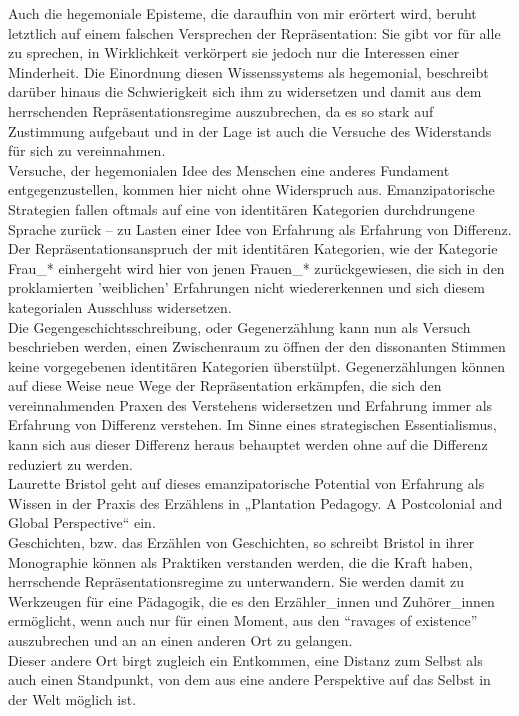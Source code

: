   \noindent Auch die hegemoniale Episteme, die daraufhin von
  mir erörtert wird, beruht letztlich auf einem falschen Versprechen der
  Repräsentation: Sie gibt vor für alle zu sprechen,  in Wirklichkeit
  verkörpert sie jedoch nur die Interessen einer Minderheit.  Die Einordnung
  diesen Wissenssystems als hegemonial, beschreibt darüber hinaus die
  Schwierigkeit sich ihm zu widersetzen und damit aus dem herrschenden
  Repräsentationsregime auszubrechen, da es so stark auf  Zustimmung aufgebaut
  und in der Lage ist auch die Versuche des Widerstands für sich zu
  vereinnahmen.\\

  \noindent Versuche, der hegemonialen Idee des  Menschen eine anderes Fundament
  entgegenzustellen,  kommen hier nicht ohne Widerspruch aus. Emanzipatorische
  Strategien fallen oftmals auf eine von identitären Kategorien durchdrungene
  Sprache zurück – zu Lasten einer Idee von Erfahrung als Erfahrung von
  Differenz. Der Repräsentationsanspruch der mit identitären Kategorien, wie
  der Kategorie Frau\_* einhergeht wird hier von jenen Frauen\_* zurückgewiesen,
  die sich in den proklamierten 'weiblichen' Erfahrungen nicht wiedererkennen
  und sich diesem kategorialen Ausschluss widersetzen.\\

  \noindent Die Gegengeschichtsschreibung, oder Gegenerzählung kann nun als Versuch
  beschrieben werden, einen Zwischenraum zu öffnen der den dissonanten Stimmen
  keine vorgegebenen identitären Kategorien überstülpt. Gegenerzählungen  können
  auf diese Weise neue Wege der Repräsentation erkämpfen, die sich den
  vereinnahmenden Praxen des Verstehens widersetzen und Erfahrung immer als
  Erfahrung von Differenz verstehen. Im Sinne eines strategischen
  Essentialismus, kann sich aus dieser Differenz heraus behauptet werden ohne
  auf die Differenz reduziert zu werden.\\
 
  Laurette Bristol geht auf dieses emanzipatorische Potential von Erfahrung als
  Wissen in der Praxis des Erzählens  in  „Plantation Pedagogy. A Postcolonial
  and Global Perspective“\footnotemark {} ein.\\
  Geschichten, bzw. das Erzählen von Geschichten, so schreibt Bristol in ihrer
  Monographie können als Praktiken verstanden werden, die die Kraft haben,
  herrschende Repräsentationsregime zu unterwandern. Sie werden damit zu
  Werkzeugen für eine Pädagogik, die es den Erzähler\_innen und Zuhörer\_innen
  ermöglicht, wenn auch nur für einen Moment, aus den “ravages of
  existence”\footnotemark {}
  auszubrechen und an an einen anderen Ort zu gelangen. \\
  Dieser andere Ort birgt
  zugleich ein Entkommen, eine Distanz zum Selbst  als auch einen Standpunkt,
  von dem aus eine andere Perspektive auf das Selbst in der Welt möglich ist.\\

